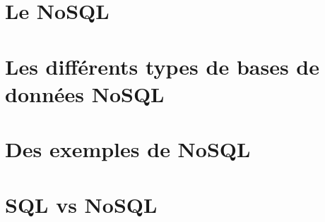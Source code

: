 \documentclass[11pt]{article}
\title{\color{blue}\titre}
\author{\eleves}
\date{\today}
\begin{document}
\maketitle
\thispagestyle{empty}
  
\section*{Le NoSQL}


\section*{Les différents types de bases de données NoSQL}


\section*{Des exemples de NoSQL}


\section*{SQL vs NoSQL}


\printindex



\end{document}
